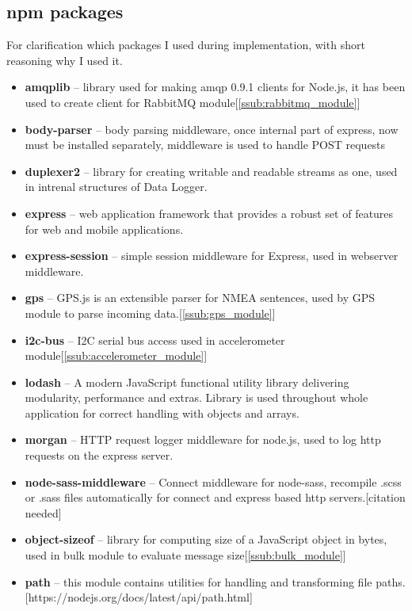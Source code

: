 \subsection{npm packages} %
\label{sub:npm_packages}
For clarification which packages I used during implementation, with short reasoning why I used it.
\begin{itemize}
	\item \textbf{amqplib} -- library used for making amqp 0.9.1 clients for Node.js, it has been used to create client for RabbitMQ module[\ref{ssub:rabbitmq_module}]
   	\item \textbf{body-parser} -- body parsing middleware, once internal part of express, now must be installed separately, middleware is used to handle POST requests
    \item \textbf{duplexer2} -- library for creating writable and readable streams as one, used in intrenal structures of Data Logger.
    \item \textbf{express} -- web application framework that provides a robust set of features for web and mobile applications.
	\item \textbf{express-session} -- simple session middleware for Express, used in webserver middleware.
	\item \textbf{gps} -- GPS.js is an extensible parser for NMEA sentences, used by GPS module to parse incoming data.[\ref{ssub:gps_module}]
    \item \textbf{i2c-bus} -- I2C serial bus access used in accelerometer module[\ref{ssub:accelerometer_module}]
    \item \textbf{lodash} -- A modern JavaScript functional utility library delivering modularity, performance and extras. Library is used throughout whole application for correct handling with objects and arrays.
    \item \textbf{morgan} -- HTTP request logger middleware for node.js, used to log http requests on the express server.
    \item \textbf{node-sass-middleware} -- Connect middleware for node-sass, recompile .scss or .sass files automatically for connect and express based http servers.[citation needed]
    \item \textbf{object-sizeof} -- library for computing size of a JavaScript object in bytes, used in bulk module to evaluate message size[\ref{ssub:bulk_module}]
    \item \textbf{path} -- this module contains utilities for handling and transforming file paths.[https://nodejs.org/docs/latest/api/path.html]

\end{itemize}
